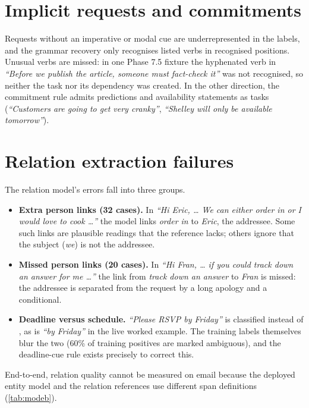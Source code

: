 \section{Implicit requests and commitments}
Requests without an imperative or modal cue are underrepresented in the labels, and the grammar recovery only recognises listed verbs in recognised positions. Unusual verbs are missed: in one Phase 7.5 fixture the hyphenated verb in \emph{``Before we publish the article, someone must fact-check it''} was not recognised, so neither the task nor its dependency was created. In the other direction, the commitment rule admits predictions and availability statements as tasks (\emph{``Customers are going to get very cranky''}, \emph{``Shelley will only be available tomorrow''}).

\section{Relation extraction failures}
The relation model's errors fall into three groups.
\begin{itemize}
  \item \textbf{Extra person links (32 cases).} In \emph{``Hi Eric, \ldots{} We can either order in or I would love to cook \ldots''} the model links \emph{order in} to \emph{Eric}, the addressee. Some such links are plausible readings that the reference lacks; others ignore that the subject (\emph{we}) is not the addressee.
  \item \textbf{Missed person links (20 cases).} In \emph{``Hi Fran, \ldots{} if you could track down an answer for me \ldots''} the link from \emph{track down an answer} to \emph{Fran} is missed: the addressee is separated from the request by a long apology and a conditional.
  \item \textbf{Deadline versus schedule.} \emph{``Please RSVP by Friday''} is classified  instead of , as is \emph{``by Friday''} in the live worked example. The training labels themselves blur the two (60\% of  training positives are marked ambiguous), and the deadline-cue rule exists precisely to correct this.
\end{itemize}
End-to-end, relation quality cannot be measured on email because the deployed entity model and the relation references use different span definitions (\cref{tab:modeb}).

